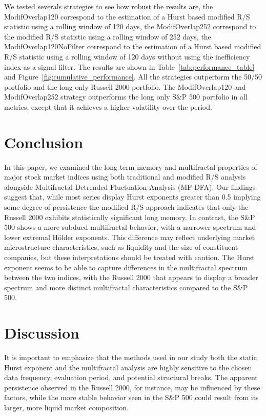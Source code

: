 \documentclass[11pt]{extarticle}
\begin{document}
We tested severals strategies to see how robust the results are, the ModifOverlap120 correspond to the estimation of a
Hurst based modified R/S statistic using a rolling window of 120 days, the ModifOverlap252 correspond to the
modified R/S statistic using a rolling window of 252 days, the ModifOverlap120NoFilter correspond to the estimation of a
Hurst based modified R/S statistic using a rolling window of 120 days without using the inefficiency index as a signal filter.
The results are shown in Table~\ref{tab:performance_table} and Figure~\ref{fig:cumulative_performance}.
All the strategies outperform the 50/50 portfolio and the long only Russell 2000 portfolio.
The ModifOverlap120 and ModifOverlap252 strategy outperforms the long only S\&P 500 portfolio in all metrics, except
that it achieves a higher volatility over the period.


\section{Conclusion}

In this paper, we examined the long-term memory and multifractal properties of major stock market indices using both
traditional and modified R/S analysis alongside Multifractal Detrended Fluctuation Analysis (MF-DFA). Our findings
suggest that, while most series display Hurst exponents greater than 0.5 implying some degree of persistence the
modified R/S approach indicates that only the Russell 2000 exhibits statistically significant long memory.
In contrast, the S\&P 500 shows a more subdued multifractal behavior, with a narrower spectrum and lower extremal Hölder
exponents. This difference may reflect underlying market microstructure characteristics, such as liquidity and the size
of constituent companies, but these interpretations should be treated with caution. The Hurst exponent seems to be able
to capture differences in the multifractal spectrum between the two indices, with the Russell 2000 that appears to
display a broader spectrum and more distinct multifractal characteristics compared to the S\&P 500.

\section{Discussion}

It is important to emphasize that the methods used in our study both the static Hurst exponent and the multifractal
analysis are highly sensitive to the chosen data frequency, evaluation period, and potential structural breaks. The
apparent persistence observed in the Russell 2000, for instance, may be influenced by these factors, while the more
stable behavior seen in the S\&P 500 could result from its larger, more liquid market composition.
\end{document}
